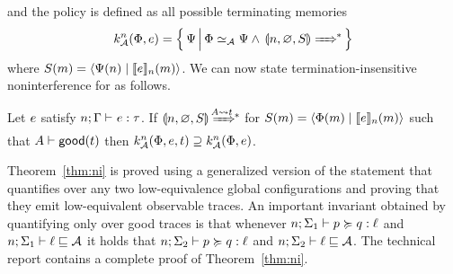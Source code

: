 and the policy \cite{6234468} is defined as all possible terminating memories
\begin{equation*}
k^n_{\Attacker}(\globalstore, \expr) = \left\{ \,\altglobalstore \, \middle\vert \, \globalstore \simeq_{\Attacker} \altglobalstore \wedge \, \gconfig{n}{\emptyenv}{S} \gstepstos \, \right\}
\end{equation*}
where $S(m) = \langle \Psi(n) \mid \llbracket e \rrbracket_n(m) \rangle$. We can now state termination-insensitive noninterference for \lang{} as follows.

\begin{theorem}[Noninterference]\label{thm:ni}
Let $e$ satisfy $\hastype{n; \tenv}{\expr}{\type}$.
If $\gconfig{n}{\varnothing}{S} \gstepstos[][A \filtertrace t]$ for $S(m) = \langle \Phi(m) \mid \llbracket e \rrbracket_n(m) \rangle$ such that $A \vdash \mathsf{good}(t)$ then $k^n_{\mathcal{A}}(\Phi, e, t) \supseteq k^n_{\mathcal{A}}(\Phi, e)$.
\end{theorem}

Theorem~\ref{thm:ni} is proved using a generalized version of the statement that quantifies over any two low-equivalence global configurations and proving that they emit low-equivalent observable traces. An important invariant obtained by quantifying only over good traces is that whenever $n; \Sigma_1 \vdash p \succcurlyeq q : \ell$ and $n; \Sigma_1 \vdash \ell \sqsubseteq \mathcal{A}$ it holds that $n; \Sigma_2 \vdash p \succcurlyeq q : \ell$ and $n; \Sigma_2 \vdash \ell \sqsubseteq \mathcal{A}$. The technical report \cite{techreport} contains a complete proof of Theorem~\ref{thm:ni}.

